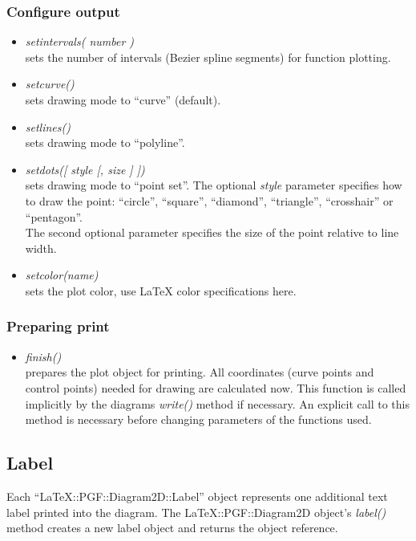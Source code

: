 \documentclass[origlongtable]{scrartcl}
\begin{document}
\subsubsection{Configure output}
\begin{itemize}
\item	\textit{set\textunderscore{}intervals( number )\/}\\
sets the number of intervals (Bezier spline segments) for function plotting.
\item	\textit{set\textunderscore{}curve()\/}\\
sets drawing mode to ``curve'' (default).
\item	\textit{set\textunderscore{}lines()\/}\\
sets drawing mode to ``polyline''.
\item	\textit{set\textunderscore{}dots([ style [, size ]  ])\/}\\
sets drawing mode to ``point set''.
The optional
\textit{style} parameter specifies how to draw the point:
"`circle"', "`square"', "`diamond"', "`triangle"', "`crosshair"' or
"`pentagon"'.\\
The second optional parameter specifies the size of the point
relative to line width.
\item	\textit{set\textunderscore{}color(name)\/}\\
sets the plot color, use \LaTeX{} color specifications here.
\end{itemize}
\subsubsection{Preparing print}
\begin{itemize}
\item	\textit{finish()\/}\\
prepares the plot object for printing. All coordinates (curve points and
control points) needed for drawing are calculated now. This function is
called implicitly by the diagrams \textit{write()\/} method if necessary.
An explicit call to this method is necessary before changing
parameters of the functions used.
\end{itemize}
\clearpage
\subsection{Label}
Each ``LaTeX::PGF::Diagram2D::Label'' object represents one additional
text label printed into the diagram.
The LaTeX::PGF::Diagram2D object's \textit{label()\/} method creates a new
label object and returns the object reference.
\end{document}
